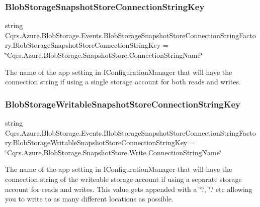 \subsubsection{\texorpdfstring{Blob\+Storage\+Snapshot\+Store\+Connection\+String\+Key}{BlobStorageSnapshotStoreConnectionStringKey}}
{\footnotesize\ttfamily string Cqrs.\+Azure.\+Blob\+Storage.\+Events.\+Blob\+Storage\+Snapshot\+Store\+Connection\+String\+Factory.\+Blob\+Storage\+Snapshot\+Store\+Connection\+String\+Key = \char`\"{}Cqrs.\+Azure.\+Blob\+Storage.\+Snapshot\+Store.\+Connection\+String\+Name\char`\"{}\hspace{0.3cm}{\ttfamily [static]}}



The name of the app setting in I\+Configuration\+Manager that will have the connection string if using a single storage account for both reads and writes. 

\mbox{\label{classCqrs_1_1Azure_1_1BlobStorage_1_1Events_1_1BlobStorageSnapshotStoreConnectionStringFactory_a5b920e37137fbfb098eb74a7177c1de7_a5b920e37137fbfb098eb74a7177c1de7}} 
\subsubsection{\texorpdfstring{Blob\+Storage\+Writable\+Snapshot\+Store\+Connection\+String\+Key}{BlobStorageWritableSnapshotStoreConnectionStringKey}}
{\footnotesize\ttfamily string Cqrs.\+Azure.\+Blob\+Storage.\+Events.\+Blob\+Storage\+Snapshot\+Store\+Connection\+String\+Factory.\+Blob\+Storage\+Writable\+Snapshot\+Store\+Connection\+String\+Key = \char`\"{}Cqrs.\+Azure.\+Blob\+Storage.\+Snapshot\+Store.\+Write.\+Connection\+String\+Name\char`\"{}\hspace{0.3cm}{\ttfamily [static]}}



The name of the app setting in I\+Configuration\+Manager that will have the connection string of the writeable storage account if using a separate storage account for reads and writes. This value gets appended with a \char`\"{}.\char`\"{}, \char`\"{}.\char`\"{} etc allowing you to write to as many different locations as possible. 

